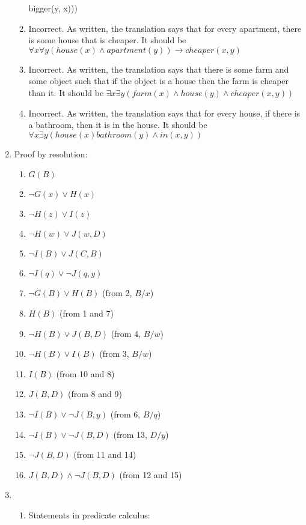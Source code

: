 \documentclass[11pt]{article}
\begin{document}
\begin{enumerate}[label=\bfseries Question \arabic*:]
\begin{enumerate}
    bigger(y, x)))\)
  \item Incorrect.  As written, the translation says that for every
    apartment, there is some house that is cheaper. It should be
    \(\forall x \forall y (house(x) \land apartment(y)) \rightarrow
    cheaper(x, y)\)
  \item Incorrect.  As written, the translation says that there is
    some farm and some object such that if the object is a house then
    the farm is cheaper than it. It should be
    \(\exists x \exists y (farm(x) \land house(y) \land cheaper(x,
    y))\)
  \item Incorrect.  As written, the translation says that for every
    house, if there is a bathroom, then it is in the house.  It should
    be \(\forall x \exists y (house(x) bathroom(y) \land in(x, y))\)
  \end{enumerate}
\item Proof by resolution:
  \begin{enumerate}[label=\arabic*.]
  \item \(G(B)\)
  \item \(\lnot G(x) \lor H(x)\)
  \item \(\lnot H(z) \lor I(z)\)
  \item \(\lnot H(w) \lor J(w, D)\)
  \item \(\lnot I(B) \lor J(C, B)\)
  \item \(\lnot I(q) \lor \lnot J(q, y)\)
  \item \(\lnot G(B) \lor H(B)\) (from 2, \(B/x\))
  \item \(H(B)\) (from 1 and 7)
  \item \(\lnot H(B) \lor J(B, D)\) (from 4, \(B/w\))
  \item \(\lnot H(B) \lor I(B)\) (from 3, \(B/w\))
  \item \(I(B)\) (from 10 and 8)
  \item \(J(B, D)\) (from 8 and 9)
  \item \(\lnot I(B) \lor \lnot J(B, y)\) (from 6, \(B/q\))
  \item \(\lnot I(B) \lor \lnot J(B, D)\) (from 13, \(D/y\))
  \item \(\lnot J(B, D)\) (from 11 and 14)
  \item \(J(B, D)\land \lnot J(B, D)\) (from 12 and 15)
  \end{enumerate}
\item
  \begin{enumerate}
  \item Statements in predicate calculus:
    \begin{enumerate}[label=\arabic*.]

\end{enumerate}
\end{enumerate}
\end{enumerate}
\end{document}
